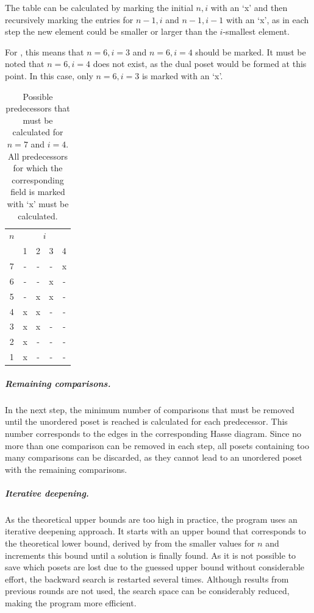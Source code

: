 \documentclass[a4paper,UKenglish,cleveref, autoref, thm-restate]{lipics-v2021}
\begin{document}
The table can be calculated by marking the initial $n, i$ with an `x' and then recursively marking the entries for $n - 1, i$ and $n - 1, i - 1$ with an `x', as in each step the new element could be smaller or larger than the $i$-smallest element.

For , this means that $n = 6, i = 3$ and $n = 6, i = 4$ should be marked.
It must be noted that $n = 6, i = 4$ does not exist, as the dual poset would be formed at this point.
In this case, only $n = 6, i = 3$ is marked with an `x'.

\begin{table}[!t]
  \renewcommand{\arraystretch}{1.1}
  \caption{Possible predecessors that must be calculated for $n = 7$ and $i = 4$.
    All predecessors for which the corresponding field is marked with `x' must be calculated.}
  \label{table:n_i_values_calculated}
  \centering
  \small
  \begin{tabular}{c|cccc}
    $n$ & \multicolumn{4}{c}{$i$}             \\
        & 1                       & 2 & 3 & 4 \\ \hline
    7   & -                       & - & - & x \\
    6   & -                       & - & x & - \\
    5   & -                       & x & x & - \\
    4   & x                       & x & - & - \\
    3   & x                       & x & - & - \\
    2   & x                       & - & - & - \\
    1   & x                       & - & - & - \\
  \end{tabular}%
\end{table}

\subparagraph{Remaining comparisons.}
In the next step, the minimum number of comparisons that must be removed until the unordered poset is reached is calculated for each predecessor.
This number corresponds to the edges in the corresponding Hasse diagram.
Since no more than one comparison can be removed in each step, all posets containing too many comparisons can be discarded, as they cannot lead to an unordered poset with the remaining comparisons.


\subparagraph{Iterative deepening.}
As the theoretical upper bounds are too high in practice, the program uses an iterative deepening approach.
It starts with an upper bound that corresponds to the theoretical lower bound, derived by  from the smaller values for $n$ and increments this bound until a solution is finally found.
As it is not possible to save which posets are lost due to the guessed upper bound without considerable effort, the backward search is restarted several times.
Although results from previous rounds are not used, the search space can be considerably reduced, making the program more efficient.
\end{document}

